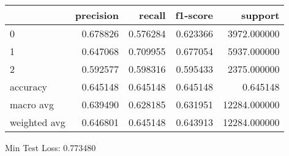 \begin{tabular}{lrrrr}
\toprule
{} &  precision &    recall &  f1-score &       support \\
\midrule
0            &   0.678826 &  0.576284 &  0.623366 &   3972.000000 \\
1            &   0.647068 &  0.709955 &  0.677054 &   5937.000000 \\
2            &   0.592577 &  0.598316 &  0.595433 &   2375.000000 \\
accuracy     &   0.645148 &  0.645148 &  0.645148 &      0.645148 \\
macro avg    &   0.639490 &  0.628185 &  0.631951 &  12284.000000 \\
weighted avg &   0.646801 &  0.645148 &  0.643913 &  12284.000000 \\
\bottomrule
\end{tabular}

Min Test Loss: 0.773480